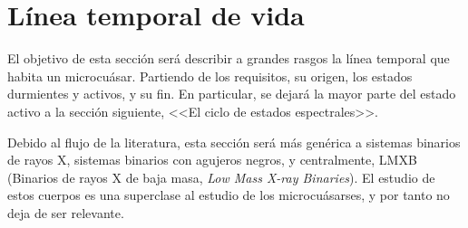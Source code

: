   \section{Línea temporal de vida}

\noindent El objetivo de esta sección será describir a grandes rasgos la línea temporal que habita un microcuásar. Partiendo de los requisitos, su origen, los estados durmientes y activos, y su fin. En particular, se dejará la mayor parte del estado activo a la sección siguiente, <<El ciclo de estados espectrales>>. 

Debido al flujo de la literatura, esta sección será más genérica a sistemas binarios de rayos X, sistemas binarios con agujeros negros, y centralmente, LMXB (Binarios de rayos X de baja masa, \textit{Low Mass X-ray Binaries}). El estudio de estos cuerpos es una superclase al estudio de los microcuásarses, y por tanto no deja de ser relevante.

